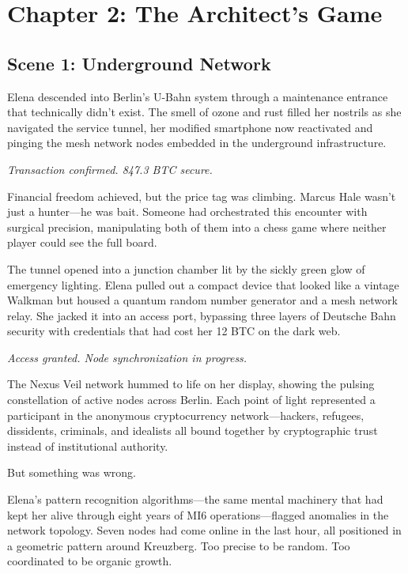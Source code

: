 \hypertarget{chapter-2-the-architects-game}{%
\section{Chapter 2: The Architect's Game}\label{chapter-2-the-architects-game}}

\hypertarget{scene-1-underground-network}{%
\subsection{Scene 1: Underground Network}\label{scene-1-underground-network}}

Elena descended into Berlin's U-Bahn system through a maintenance entrance that technically didn't exist. The smell of ozone and rust filled her nostrils as she navigated the service tunnel, her modified smartphone now reactivated and pinging the mesh network nodes embedded in the underground infrastructure.

\emph{Transaction confirmed. 847.3 BTC secure.}

Financial freedom achieved, but the price tag was climbing. Marcus Hale wasn't just a hunter---he was bait. Someone had orchestrated this encounter with surgical precision, manipulating both of them into a chess game where neither player could see the full board.

The tunnel opened into a junction chamber lit by the sickly green glow of emergency lighting. Elena pulled out a compact device that looked like a vintage Walkman but housed a quantum random number generator and a mesh network relay. She jacked it into an access port, bypassing three layers of Deutsche Bahn security with credentials that had cost her 12 BTC on the dark web.

\emph{Access granted. Node synchronization in progress.}

The Nexus Veil network hummed to life on her display, showing the pulsing constellation of active nodes across Berlin. Each point of light represented a participant in the anonymous cryptocurrency network---hackers, refugees, dissidents, criminals, and idealists all bound together by cryptographic trust instead of institutional authority.

But something was wrong.

Elena's pattern recognition algorithms---the same mental machinery that had kept her alive through eight years of MI6 operations---flagged anomalies in the network topology. Seven nodes had come online in the last hour, all positioned in a geometric pattern around Kreuzberg. Too precise to be random. Too coordinated to be organic growth.

